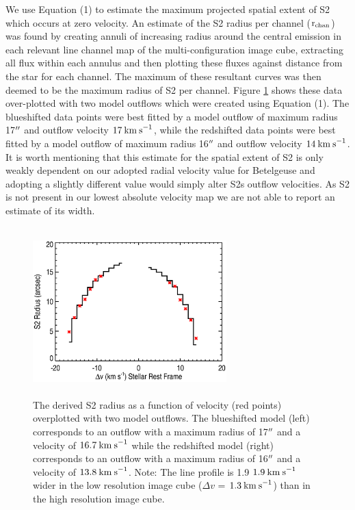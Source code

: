 \documentclass[iop]{emulateapj}
\begin{document}
We use Equation (1) to estimate the maximum projected spatial extent of S2 which occurs at zero velocity. An estimate of the S2 radius per channel ($\rm{r_{chan}}$) was found by creating annuli of increasing radius around the central emission in each relevant line channel map of the multi-configuration image cube, extracting all flux within each annulus and then plotting these fluxes against distance from the star for each channel. The maximum of these resultant curves was then deemed to be the maximum radius of S2 per channel. Figure \ref{fig:fig5} shows these data over-plotted with two model outflows which were created using Equation (1). The blueshifted data points were best fitted by a model outflow of maximum radius 17$\mbox{$^{\prime\prime}$}$ and outflow velocity $17\>{\rm km\>s}^{-1}$, while the redshifted data points were best fitted by a model outflow of maximum radius 16$\mbox{$^{\prime\prime}$}$ and outflow velocity $14\>{\rm km\>s}^{-1}$. It is worth mentioning that this estimate for the spatial extent of S2 is only weakly dependent on our adopted radial velocity value for Betelgeuse and adopting a slightly different value would simply alter S2s outflow velocities. As S2 is not present in our lowest absolute velocity map we are not able to report an estimate of its width.

\begin{figure}
\includegraphics[trim=45pt 0pt 80pt 10pt, width=7.5cm, height=6.5cm]{f13.eps}
\caption{The derived S2 radius as a function of velocity (red points) overplotted with two model outflows. The blueshifted model (left) corresponds to an outflow with a maximum radius of 17$\mbox{$^{\prime\prime}$}$ and a velocity of $16.7\>{\rm km\>s}^{-1}$ while the redshifted model (right) corresponds to an outflow with a maximum radius of 16$\mbox{$^{\prime\prime}$}$ and a velocity of $13.8\>{\rm km\>s}^{-1}$. Note: The line profile is 1.9 $1.9\>{\rm km\>s}^{-1}$ wider in the low resolution image cube ($\Delta v$ = $1.3\>{\rm km\>s}^{-1}$) than in the high resolution image cube.}
\label{fig:fig5}
\end{figure}
\end{document}
